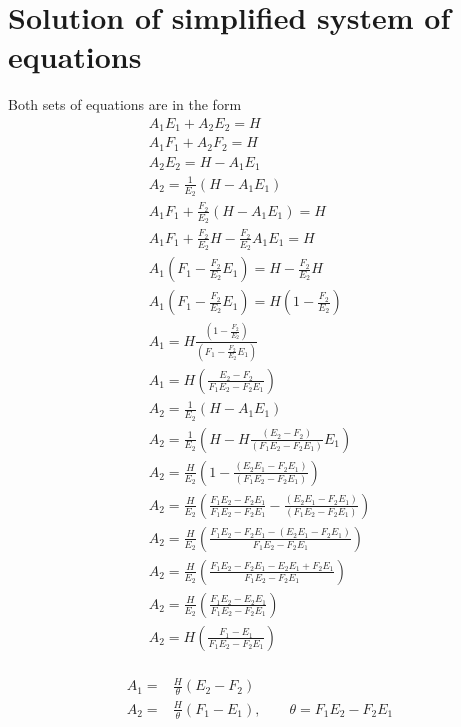 \documentclass[11pt]{article}
\begin{document}
\doublespacing
\MOONSTITLE

\section{Solution of simplified system of equations}
\footnotesize Both sets of equations are in the form
\begin{equation}\begin{aligned}
A_1 E_1 + A_2 E_2 = H \\
A_1 F_1 + A_2 F_2 = H \\
A_2 E_2 = H - A_1 E_1 \\
A_2 = \frac{1}{E_2} (H - A_1 E_1) \\
A_1 F_1 + \frac{F_2}{E_2} (H - A_1 E_1) = H \\
A_1 F_1 + \frac{F_2}{E_2} H - \frac{F_2}{E_2} A_1 E_1 = H \\
A_1 \left( F_1 - \frac{F_2}{E_2} E_1 \right) = H -\frac{F_2}{E_2} H \\
A_1 \left( F_1 - \frac{F_2}{E_2} E_1 \right) = H \left( 1 - \frac{F_2}{E_2} \right) \\
A_1 = H \frac{\left( 1 - \frac{F_2}{E_2} \right)}{\left( F_1 - \frac{F_2}{E_2} E_1 \right)} \\
\boxed{A_1 = H \left( \frac{E_2 - F_2}{F_1 E_2 - F_2 E_1} \right) } \\
A_2 = \frac{1}{E_2} \left(H - A_1 E_1 \right) \\
A_2 = \frac{1}{E_2} \left(H - H \frac{( E_2 - F_2 )}{( F_1 E_2 - F_2 E_1)} E_1 \right) \\
A_2 = \frac{H}{E_2} \left(1 - \frac{(E_2 E_1 - F_2 E_1)}{(F_1 E_2 - F_2 E_1)} \right) \\
A_2 = \frac{H}{E_2} \left(\frac{F_1 E_2 - F_2 E_1}{F_1 E_2 - F_2 E_1} - \frac{(E_2 E_1 - F_2 E_1)}{(F_1 E_2 - F_2 E_1)} \right) \\
A_2 = \frac{H}{E_2} \left(\frac{F_1 E_2 - F_2 E_1 - (E_2 E_1 - F_2 E_1)}{F_1 E_2 - F_2 E_1}\right) \\
A_2 = \frac{H}{E_2} \left(\frac{F_1 E_2 - F_2 E_1 - E_2 E_1 + F_2 E_1}{F_1 E_2 - F_2 E_1}\right) \\
A_2 = \frac{H}{E_2} \left(\frac{F_1 E_2 - E_2 E_1}{F_1 E_2 - F_2 E_1}\right) \\
\boxed{A_2 = H \left(\frac{F_1 - E_1}{F_1 E_2 - F_2 E_1}\right)} \\
\end{aligned} \end{equation}

\begin{equation}\begin{aligned}
A_1 =& \frac{H}{\theta} (E_2 - F_2) \\
A_2 =& \frac{H}{\theta} (F_1 - E_1), \qquad \theta = F_1 E_2 - F_2 E_1 \\
\end{aligned} \end{equation}
\end{document}
